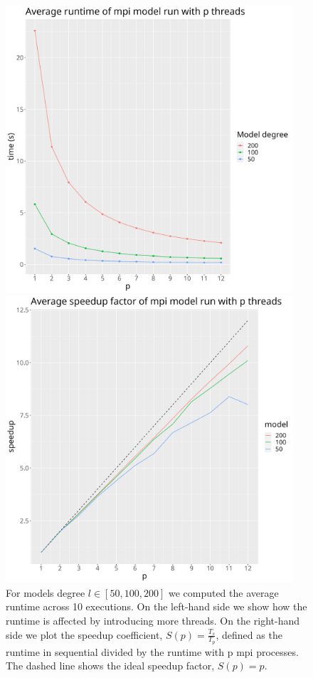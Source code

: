 \documentclass[a4paper]{article}
\theoremstyle{definition}
\begin{document}
\begin{figure}[h!]
\begin{minipage}{0.45\linewidth}
    \centering
    \includegraphics[width=0.95\textwidth]{media/mpi_runtime.png}
\end{minipage}
\begin{minipage}{0.45\linewidth}
    \centering
    \includegraphics[width=0.95\textwidth]{media/mpi_speedup.png}
\end{minipage}
\caption{For models degree $l \in [50, 100, 200]$ we computed the average runtime across 10 executions. On the left-hand side we show how the runtime is affected
by introducing more threads. On the right-hand side we plot the speedup coefficient, $S(p) = \frac{T_s}{T_p}$, defined as the runtime in sequential divided by the 
runtime with p mpi processes. The dashed line shows the ideal speedup factor, $S(p) = p$.}
\end{figure}
\end{document}
